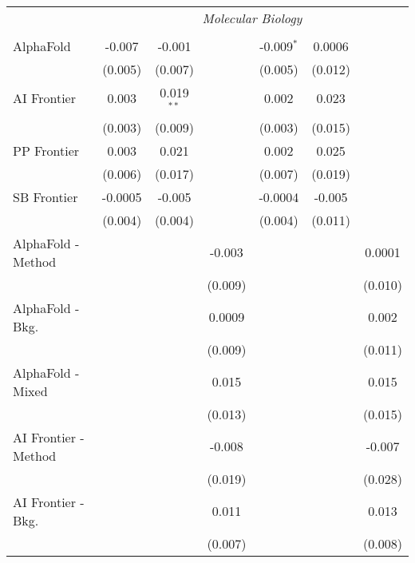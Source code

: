 \begin{tabular}{lcccccc}
 & \multicolumn{6}{c}{\textit{Molecular Biology}} \\ \\
   AlphaFold            & -0.007  & -0.001       &               & -0.009$^{*}$ & 0.0006  &   \\   
                        & (0.005) & (0.007)      &               & (0.005)      & (0.012) &   \\   
   AI Frontier          & 0.003   & 0.019$^{**}$ &               & 0.002        & 0.023   &   \\   
                        & (0.003) & (0.009)      &               & (0.003)      & (0.015) &   \\   
   PP Frontier          & 0.003   & 0.021        &               & 0.002        & 0.025   &   \\   
                        & (0.006) & (0.017)      &               & (0.007)      & (0.019) &   \\   
   SB Frontier          & -0.0005 & -0.005       &               & -0.0004      & -0.005  &   \\   
                        & (0.004) & (0.004)      &               & (0.004)      & (0.011) &   \\   
   AlphaFold - Method   &         &              & -0.003        &              &         & 0.0001\\   
                        &         &              & (0.009)       &              &         & (0.010)\\   
   AlphaFold - Bkg.     &         &              & 0.0009        &              &         & 0.002\\   
                        &         &              & (0.009)       &              &         & (0.011)\\   
   AlphaFold - Mixed    &         &              & 0.015         &              &         & 0.015\\   
                        &         &              & (0.013)       &              &         & (0.015)\\   
   AI Frontier - Method &         &              & -0.008        &              &         & -0.007\\   
                        &         &              & (0.019)       &              &         & (0.028)\\   
   AI Frontier - Bkg.   &         &              & 0.011         &              &         & 0.013\\   
                        &         &              & (0.007)       &              &         & (0.008)\\   

\end{tabular}
